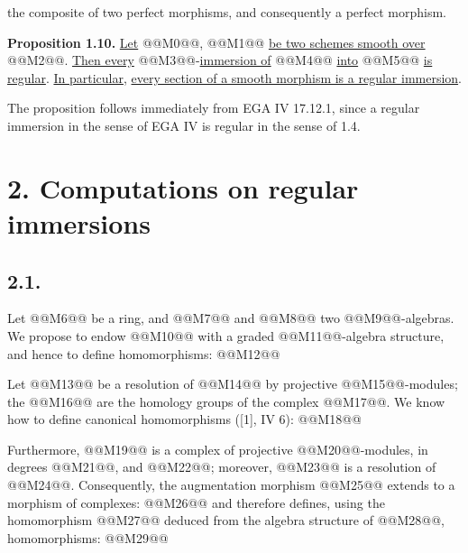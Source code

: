 the composite of two perfect morphisms, and consequently a perfect morphism.

\textbf{Proposition 1.10.} \uline{Let} @@M0@@, @@M1@@ \uline{be two schemes smooth over} @@M2@@. \uline{Then every} @@M3@@-\uline{immersion of} @@M4@@ \uline{into} @@M5@@ \uline{is regular}. \uline{In particular}, \uline{every section of a smooth morphism is a regular immersion}.

The proposition follows immediately from EGA IV 17.12.1, since a regular immersion in the sense of EGA IV is regular in the sense of 1.4.

\section*{2. Computations on regular immersions}

\subsection*{2.1.}
Let @@M6@@ be a ring, and @@M7@@ and @@M8@@ two @@M9@@-algebras. We propose to endow @@M10@@ with a graded @@M11@@-algebra structure, and hence to define homomorphisms:
@@M12@@

Let @@M13@@ be a resolution of @@M14@@ by projective @@M15@@-modules; the @@M16@@ are the homology groups of the complex @@M17@@. We know how to define canonical homomorphisms ([1], IV 6):
@@M18@@

Furthermore, @@M19@@ is a complex of projective @@M20@@-modules, in degrees @@M21@@, and @@M22@@; moreover, @@M23@@ is a resolution of @@M24@@. Consequently, the augmentation morphism @@M25@@ extends to a morphism of complexes: @@M26@@ and therefore defines, using the homomorphism @@M27@@ deduced from the algebra structure of @@M28@@, homomorphisms:
@@M29@@
